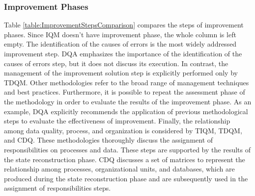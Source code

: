 \documentclass[pdftex,english,oribibl]{llncs}
\begin{document}
\subsubsection{Improvement Phases}
Table \ref{table:ImprovementStepsComparison} compares the steps of improvement phases. Since IQM doesn't have improvement phase, the whole column is left empty.
The identification of the causes of errors is the most widely addressed improvement step.
DQA emphasizes the importance of the identification of the causes of errors step, but it does not discuss its execution.
In contrast, the management of the improvement solution step is explicitly performed only by TDQM.
Other methodologies refer to the broad range of management techniques and best practices.
Furthermore, it is possible to repeat the assessment phase of the methodology in order to evaluate the results of the improvement phase.
As an example, DQA explicitly recommends the application of previous methodological steps to evaluate the effectiveness of improvement.
Finally, the relationship among data quality, process, and organization is considered by TIQM, TDQM, and CDQ.
These methodologies thoroughly discuss the assignment of responsibilities on processes and data.
These steps are supported by the results of the state reconstruction phase.
CDQ discusses a set of matrices to represent the relationship among processes, organizational units, and databases, which are produced during the state reconstruction phase and are subsequently used in the assignment of responsibilities steps.
\end{document}
